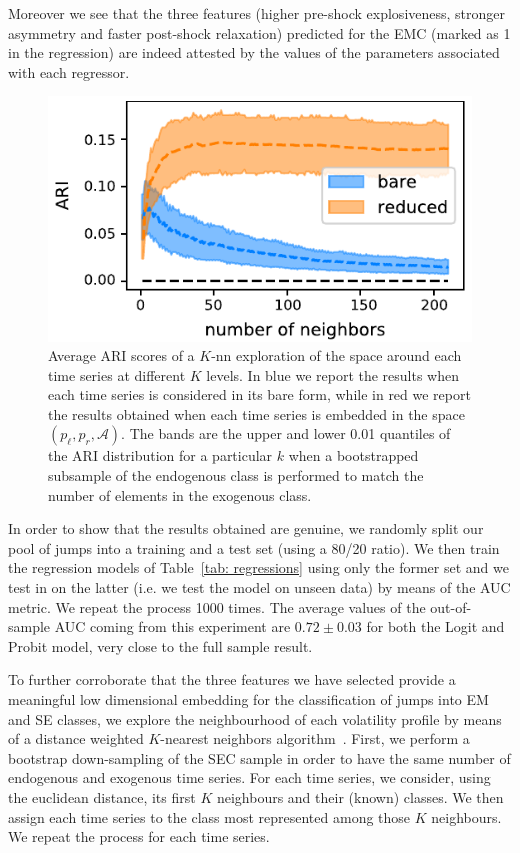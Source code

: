 \documentclass[amsmath,amssymb,aps,pre,floatfix,twocolumn,superscriptaddress]{revtex4}
\begin{document}
Moreover we see that the three features (higher pre-shock explosiveness, stronger asymmetry and faster post-shock relaxation) predicted for the EMC (marked as 1 in the regression) are indeed attested by the values of the parameters associated with each regressor.

\begin{figure}[t]
  \centering
  \includegraphics[scale=0.9]{knn_scipy_fit.pdf} 
  \caption{Average ARI scores of a $K$-nn exploration of the space around each time series at different $K$ levels. In blue we report the results when each time series is considered in its bare form, while in red we report the results obtained when each time series is embedded in the space $(p_\ell,p_r, \mathcal{A})$. The bands are the upper and lower 0.01 quantiles of the ARI distribution for a particular $k$ when a bootstrapped subsample of the endogenous class is performed to match the number of elements in the exogenous class.}
  \label{fig: knn}
\end{figure}

In order to show that the results obtained are genuine, we randomly split our pool of jumps into a training and a test set (using a 80/20 ratio). We then train the regression models of Table~\ref{tab: regressions} using only the former set and we test in on the latter (i.e. we test the model on unseen data) by means of the AUC metric. We repeat the process 1000 times. The average values of the out-of-sample AUC coming from this experiment are  $0.72 \pm 0.03$ for both the Logit and Probit model, very close to the full sample result. 

To further corroborate that the three features we have selected provide a meaningful low dimensional embedding for the classification of jumps into EM and SE classes, we explore the neighbourhood of each volatility profile by means of a distance weighted $K$-nearest neighbors algorithm~\cite{knn_ref}. First, we perform a bootstrap down-sampling of the SEC sample in order to have the same number of endogenous and exogenous time series. For each time series, we consider, using the euclidean distance, its first $K$ neighbours and their (known) classes. We then assign each time series to the class most represented among those $K$ neighbours. We repeat the process for each time series. 
\end{document}
